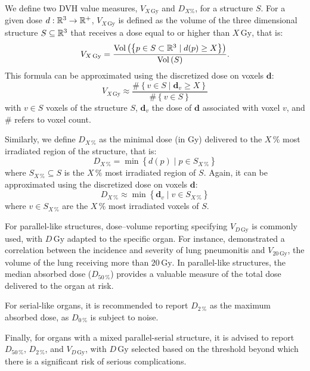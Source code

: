 We define two DVH value measures, $V_{X\,\text{Gy}}$ and $D_{X\%}$, for a structure $S$.
For a given dose $d: \mathbb{R}^3 \to \mathbb{R}^+$, $V_{X\,\text{Gy}}$ is defined as the volume of the three dimensional structure $S \subseteq \mathbb{R}^3$ that receives a dose equal to or higher than $X\,\text{Gy}$, that is:
$$ V_{X\,\text{Gy}} = \frac{\text{Vol} \left( {\left\lbrace p \in S \subset \mathbb{R}^3 \mid d(p) \geq X \right\rbrace} \right)}{\text{Vol} \left( {S} \right)}.$$
This formula can be approximated using the discretized dose on voxels $\mathbf{d}$:
$$ V_{X\,\text{Gy}} \approx \frac{ \#{\left\lbrace v \in S \mid \mathbf{d}_v \geq X \right\rbrace}}{\#\left\{ v \in S \right\}}$$
with $v \in S$ voxels of the structure $S$, $\mathbf{d}_v$ the dose of $\mathbf{d}$ associated with voxel $v$, and $\#$ refers to voxel count.

Similarly, we define $D_{X\,\%}$ as the minimal dose (in Gy) delivered to the $X\,\%$ most irradiated region of the structure, that is:
$$D_{X\,\%} = \min \left\lbrace d(p) \mid p \in S_{X\,\%} \right\rbrace$$
where $S_{X\,\%} \subseteq S$ is the $X\,\%$ most irradiated region of $S$.
Again, it can be approximated using the discretized dose on voxels $\mathbf{d}$:
$$D_{X\,\%} \approx \min \left\lbrace \mathbf{d}_v \mid v \in S_{X\,\%} \right\rbrace$$
where $v \in S_{X\,\%}$ are the $X\,\%$ most irradiated voxels of $S$.

For parallel-like structures, dose–volume reporting specifying $V_{D\,\text{Gy}}$ is commonly used, with $D\,\text{Gy}$ adapted to the specific organ.
For instance, \cite{Graham1995} demonstrated a correlation between the incidence and severity of lung pneumonitis and $V_{20\,\text{Gy}}$, the volume of the lung receiving more than $20\,\text{Gy}$.
In parallel-like structures, the median absorbed dose ($D_{50\,\%}$) provides a valuable measure of the total dose delivered to the organ at risk.

For serial-like organs, it is recommended to report $D_{2\,\%}$ as the maximum absorbed dose, as $D_{0\,\%}$ is subject to noise.

Finally, for organs with a mixed parallel-serial structure, it is advised to report $D_{50\,\%}$, $D_{2\,\%}$, and $V_{D\,\text{Gy}}$, with $D\,\text{Gy}$ selected based on the threshold beyond which there is a significant risk of serious complications.

